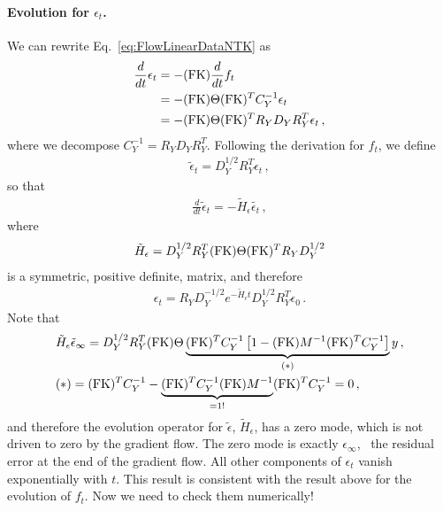 \documentclass[11pt]{article}
\begin{document}
\paragraph{Evolution for $\epsilon_t$.}
We can rewrite Eq.~\ref{eq:FlowLinearDataNTK} as 
\begin{align}
    \label{eq:FlowLinearDataNTKEpsilon}
    \frac{d}{dt} \epsilon_t &= - (\mathrm{FK}) \frac{d}{dt} f_t \nonumber \\
        &= - (\mathrm{FK}) \Theta (\mathrm{FK})^T C_Y^{-1} \epsilon_t \nonumber \\
        &= - (\mathrm{FK}) \Theta (\mathrm{FK})^T R_Y D_Y R_Y^T \epsilon_t\, ,
\end{align}
where we decompose $C_Y^{-1}=R_Y D_Y R_Y^T$.
Following the derivation for $f_t$, we define
\begin{align}
    \label{eq:RotatedEps}
    \tilde{\epsilon}_t = D_Y^{1/2} R_Y^T \epsilon_t\, , 
\end{align}
so that 
\begin{align}
     \frac{d}{dt} \tilde{\epsilon}_t = 
        - \tilde{H}_\epsilon \tilde{\epsilon_t}\, ,
\end{align}
where 
\begin{align}
    \label{eq:HSymmetricDef}
    \tilde{H}_\epsilon  = D_Y^{1/2} R_Y^T (\mathrm{FK}) \Theta (\mathrm{FK})^T R_Y D_Y^{1/2}
\end{align}
is a symmetric, positive definite, matrix, and therefore
\begin{align}
    \label{eq:SolutionForEpsilon}
    \epsilon_t = R_Y D_Y^{-1/2} e^{-\tilde{H}_\epsilon t} D_Y^{1/2} R_Y^T \epsilon_0\, .
\end{align}
Note that 
\begin{align}
    & \tilde{H}_\epsilon \tilde{\epsilon}_\infty = 
        D_Y^{1/2} R_Y^T (\mathrm{FK}) \Theta 
        \underbrace{(\mathrm{FK})^T C_Y^{-1}
        \left[
            1 - (\mathrm{FK}) M^{-1} (\mathrm{FK})^T C_Y^{-1}
        \right]}_{(*)} y\, , \nonumber \\
    & (*) = (\mathrm{FK})^T C_Y^{-1} - \underbrace{(\mathrm{FK})^T C_Y^{-1} (\mathrm{FK}) M^{-1}}_{= 1!} 
        (\mathrm{FK})^T C_Y^{-1} = 0\, ,
\end{align}
and therefore the evolution operator for $\tilde{\epsilon}$, $\tilde{H}_\epsilon$, has a zero mode, which is 
not driven to zero by the gradient flow. The zero mode is exactly $\epsilon_\infty$, \ie\ the residual error 
at the end of the gradient flow. All other components of $\epsilon_t$ vanish exponentially with $t$.
This result is consistent with the result above for the evolution of $f_t$. Now we need to 
check them numerically! 
\end{document}
